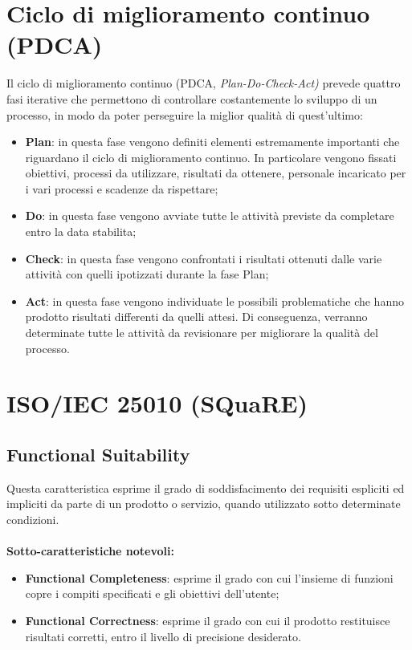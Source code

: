 \section{Ciclo di miglioramento continuo (PDCA)}
Il ciclo di miglioramento continuo (PDCA, \emph{Plan-Do-Check-Act)} prevede quattro fasi iterative che permettono di controllare costantemente lo sviluppo di un processo, in modo da poter perseguire la miglior qualità di quest'ultimo:
\begin{itemize}
	\item \textbf{Plan}: in questa fase vengono definiti elementi estremamente importanti che riguardano il ciclo di miglioramento continuo. In particolare vengono fissati obiettivi, processi da utilizzare, risultati da ottenere, personale incaricato per i vari processi e scadenze da rispettare;
	\item \textbf{Do}: in questa fase vengono avviate tutte le attività previste da completare entro la data stabilita;
	\item \textbf{Check}: in questa fase vengono confrontati i risultati ottenuti dalle varie attività con quelli ipotizzati durante la fase Plan;
	\item \textbf{Act}: in questa fase vengono individuate le possibili problematiche che hanno prodotto risultati differenti da quelli attesi. Di conseguenza, verranno determinate tutte le attività da revisionare per migliorare la qualità del processo.
\end{itemize}
\section{ISO/IEC 25010 (SQuaRE)}
\subsection{Functional Suitability}
Questa caratteristica esprime il grado di soddisfacimento dei requisiti espliciti ed impliciti da parte di un prodotto o servizio, quando utilizzato sotto determinate condizioni.\\ \\
\textbf{Sotto-caratteristiche notevoli:}
\begin{itemize}
	\item{\textbf{Functional Completeness}}: esprime il grado con cui l'insieme di funzioni copre i compiti specificati e gli obiettivi dell'utente;
	\item{\textbf{Functional Correctness}}: esprime il grado con cui il prodotto restituisce risultati corretti, entro il livello di precisione desiderato.
\end{itemize}

